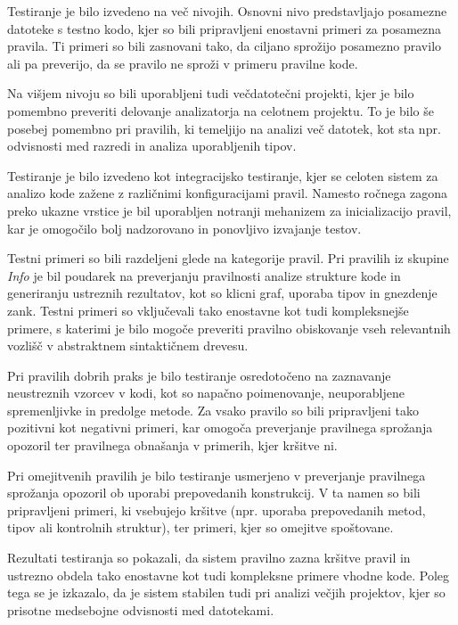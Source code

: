 \documentclass[a4paper,12pt,openright]{book}
\begin{document}
Testiranje je bilo izvedeno na več nivojih. Osnovni nivo predstavljajo posamezne datoteke s testno kodo, kjer so bili pripravljeni enostavni primeri za posamezna pravila. Ti primeri so bili zasnovani tako, da ciljano sprožijo posamezno pravilo ali pa preverijo, da se pravilo ne sproži v primeru pravilne kode.

Na višjem nivoju so bili uporabljeni tudi večdatotečni projekti, kjer je bilo pomembno preveriti delovanje analizatorja na celotnem projektu. To je bilo še posebej pomembno pri pravilih, ki temeljijo na analizi več datotek, kot sta npr. odvisnosti med razredi in analiza uporabljenih tipov.

Testiranje je bilo izvedeno kot integracijsko testiranje, kjer se celoten sistem za analizo kode zažene z različnimi konfiguracijami pravil. Namesto ročnega zagona preko ukazne vrstice je bil uporabljen notranji mehanizem za inicializacijo pravil, kar je omogočilo bolj nadzorovano in ponovljivo izvajanje testov.

Testni primeri so bili razdeljeni glede na kategorije pravil. Pri pravilih iz skupine \textit{Info} je bil poudarek na preverjanju pravilnosti analize strukture kode in generiranju ustreznih rezultatov, kot so klicni graf, uporaba tipov in gnezdenje zank. Testni primeri so vključevali tako enostavne kot tudi kompleksnejše primere, s katerimi je bilo mogoče preveriti pravilno obiskovanje vseh relevantnih vozlišč v abstraktnem sintaktičnem drevesu.

Pri pravilih dobrih praks je bilo testiranje osredotočeno na zaznavanje neustreznih vzorcev v kodi, kot so napačno poimenovanje, neuporabljene spremenljivke in predolge metode. Za vsako pravilo so bili pripravljeni tako pozitivni kot negativni primeri, kar omogoča preverjanje pravilnega sprožanja opozoril ter pravilnega obnašanja v primerih, kjer kršitve ni.

Pri omejitvenih pravilih je bilo testiranje usmerjeno v preverjanje pravilnega sprožanja opozoril ob uporabi prepovedanih konstrukcij. V ta namen so bili pripravljeni primeri, ki vsebujejo kršitve (npr. uporaba prepovedanih metod, tipov ali kontrolnih struktur), ter primeri, kjer so omejitve spoštovane.

Rezultati testiranja so pokazali, da sistem pravilno zazna kršitve pravil in ustrezno obdela tako enostavne kot tudi kompleksne primere vhodne kode. Poleg tega se je izkazalo, da je sistem stabilen tudi pri analizi večjih projektov, kjer so prisotne medsebojne odvisnosti med datotekami.
\end{document}
